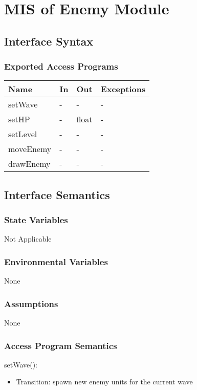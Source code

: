 \documentclass[12,english]{article}
\begin{document}
\section{MIS of Enemy Module}
\subsection{Interface Syntax}
\subsubsection{Exported Access Programs}
\begin{table}[h!]
    \centering
    \begin{tabular}{|p{4cm}|p{2cm}|p{2cm}|p{2cm}|}
    \hline
    \textbf {Name}  & {In} & {Out} & {Exceptions} \\
    \hline
    setWave & - & - & -\\
    \hline
    setHP & - & float & -\\
    \hline
    setLevel & - & - & -\\
    \hline
    moveEnemy & - & - & -\\
    \hline
    drawEnemy & - & - & -\\
    \hline
    \end{tabular}
\end{table}
\subsection{Interface Semantics}
\subsubsection{State Variables}
Not Applicable 
\subsubsection{Environmental Variables}
None
\subsubsection{Assumptions}
None
\subsubsection{Access Program Semantics}

\noindent setWave():
\begin{itemize}
    \item Transition: spawn new enemy units for the current wave
\end{itemize}
\end{document}
